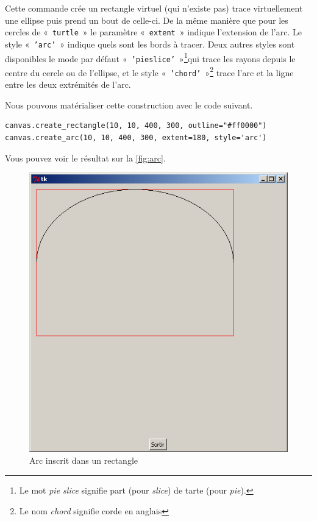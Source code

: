Cette commande crée un rectangle virtuel (qui n'existe pas) trace virtuellement une ellipse puis prend un bout de celle-ci.
De la même manière que pour les cercles de « \texttt{turtle} » le paramètre « \texttt{extent} » indique l'extension de l'arc. Le style « \texttt{'arc'} » indique quels sont les bords à tracer. Deux autres styles sont disponibles le mode par défaut « \texttt{'pieslice'} »\footnote{Le mot \emph{pie slice} signifie part (pour \emph{slice}) de tarte (pour \emph{pie}).}qui trace les rayons depuis le centre du cercle ou de l'ellipse, et le style « \texttt{'chord'} »\footnote{Le nom \emph{chord} signifie corde en anglais} trace l'arc et la ligne entre les deux extrémités de l'arc.

Nous pouvons matérialiser cette construction avec le code suivant.

\begin{Verbatim}[frame=single,rulecolor=\color{mbleu}, label=à taper]
canvas.create_rectangle(10, 10, 400, 300, outline="#ff0000")
canvas.create_arc(10, 10, 400, 300, extent=180, style='arc')
\end{Verbatim}

Vous pouvez voir le résultat sur la \autoref{fig:arc}.
\begin{figure}[h!]
\centering
\includegraphics[scale=0.4]{images/arc}
\caption{Arc inscrit dans un rectangle}\label{fig:arc}
\end{figure}

